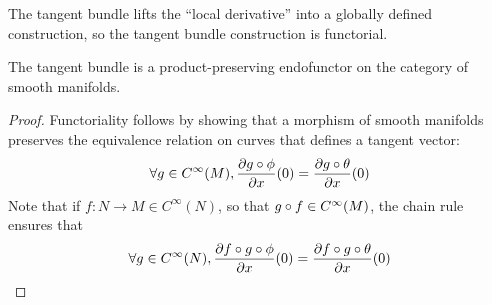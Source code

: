 The tangent bundle lifts the ``local derivative'' into a globally defined construction, so the tangent bundle construction is functorial.
\begin{proposition}
    The tangent bundle is a product-preserving endofunctor on the category of smooth manifolds.
\end{proposition}
\begin{proof}
    Functoriality follows by showing that a morphism of smooth manifolds preserves the equivalence relation on curves that defines a tangent vector: 
    \[
        \forall g \in C^\infty(M),  \frac{\partial g \circ \phi}{\partial x}(0) = \frac{\partial g \circ \theta}{\partial x}(0)
    \]
    Note that if $f:N \to M \in C^\infty(N)$, so that $g \circ f \in C^\infty(M)$, the chain rule ensures that
    \[
        \forall g \in C^\infty(N), %
        \frac{\partial f\o g \o \phi}{\partial x}(0) = \frac{\partial f\o g \o \theta}{\partial x}(0)
    \]


\end{proof}
